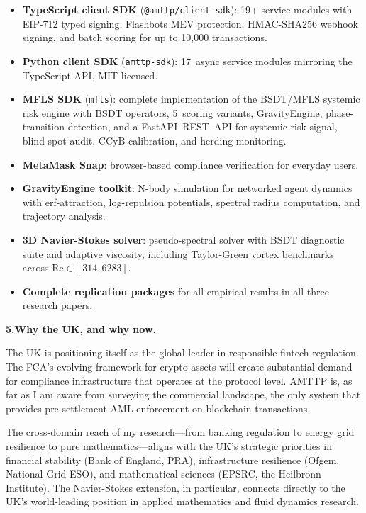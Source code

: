 \documentclass[12pt,a4paper]{article}
\begin{document}
\begin{itemize}[nosep, leftmargin=2em]
  \item \textbf{TypeScript client SDK} (\texttt{@amttp/client-sdk}):
    19+ service modules with EIP-712 typed signing, Flashbots MEV
    protection, HMAC-SHA256 webhook signing, and batch scoring for
    up to 10,000 transactions.
  \item \textbf{Python client SDK} (\texttt{amttp-sdk}):
    17~async service modules mirroring the TypeScript API, MIT licensed.
  \item \textbf{MFLS SDK} (\texttt{mfls}):
    complete implementation of the BSDT/MFLS systemic risk engine with
    BSDT operators, 5~scoring variants, GravityEngine, phase-transition
    detection, and a FastAPI~REST~API for systemic risk signal, blind-spot
    audit, CCyB calibration, and herding monitoring.
  \item \textbf{MetaMask Snap}: browser-based compliance verification
    for everyday users.
  \item \textbf{GravityEngine toolkit}: N-body simulation for networked
    agent dynamics with erf-attraction, log-repulsion potentials,
    spectral radius computation, and trajectory analysis.
  \item \textbf{3D Navier-Stokes solver}: pseudo-spectral solver with
    BSDT diagnostic suite and adaptive viscosity, including Taylor-Green
    vortex benchmarks across $\mathrm{Re}\in[314,6283]$.
  \item \textbf{Complete replication packages} for all empirical results
    in all three research papers.
\end{itemize}


\textbf{5.\enspace Why the UK, and why now.}

The UK is positioning itself as the global leader in responsible fintech
regulation.  The FCA's evolving framework for crypto-assets will create
substantial demand for compliance infrastructure that operates at the
protocol level.  AMTTP is, as far as I am aware from surveying the
commercial landscape, the only system that provides pre-settlement AML
enforcement on blockchain transactions.

The cross-domain reach of my research---from banking regulation to energy
grid resilience to pure mathematics---aligns with the UK's strategic
priorities in financial stability (Bank of England, PRA), infrastructure
resilience (Ofgem, National Grid ESO), and mathematical sciences (EPSRC,
the Heilbronn Institute).  The Navier-Stokes extension, in particular,
connects directly to the UK's world-leading position in applied
mathematics and fluid dynamics research.
\end{document}
